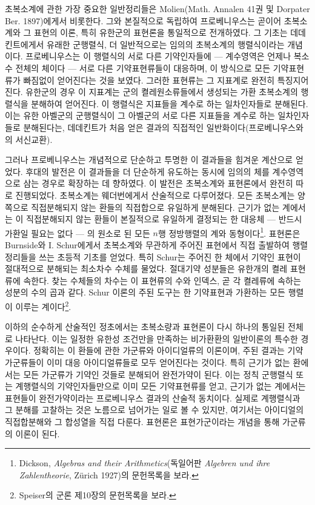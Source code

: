 초복소계에 관한 가장 중요한 일반정리들은 Molien(Math. Annalen 41권 및 Dorpater Ber. 1897)에게서 비롯한다. 그와 본질적으로 독립하여 프로베니우스는 곧이어 초복소계와 그 표현의 이론, 특히 유한군의 표현론을 통일적으로 전개하였다. 그 기초는 데데킨트에게서 유래한 군행렬식, 더 일반적으로는 임의의 초복소계의 행렬식이라는 개념이다. 프로베니우스는 이 행렬식의 서로 다른 기약인자들에 --- 계수영역은 언제나 복소수 전체의 체이다 --- 서로 다른 기약표현류들이 대응하며, 이 방식으로 모든 기약표현류가 빠짐없이 얻어진다는 것을 보였다. 그러한 표현류는 그 \glqq{}지표계\grqq{}로 완전히 특징지어진다. 유한군의 경우 이 지표계는 군의 켤레원소류들에서 생성되는 가환 초복소계의 행렬식을 분해하여 얻어진다. 이 행렬식은 지표들을 계수로 하는 일차인자들로 분해된다. 이는 유한 아벨군의 군행렬식이 그 아벨군의 서로 다른 지표들을 계수로 하는 일차인자들로 분해된다는, 데데킨트가 처음 얻은 결과의 직접적인 일반화이다(프로베니우스와의 서신교환).

그러나 프로베니우스는 개념적으로 단순하고 투명한 이 결과들을 힘겨운 계산으로 얻었다. 후대의 발전은 이 결과들을 더 단순하게 유도하는 동시에 임의의 체를 계수영역으로 삼는 경우로 확장하는 데 향하였다. 이 발전은 초복소계와 표현론에서 완전히 따로 진행되었다. 초복소계는 웨더번에게서 산술적으로 다루어졌다. 모든 초복소계는 양쪽으로 직접분해되지 않는 환들의 직접합으로 유일하게 분해된다. 근기가 없는 계에서는 이 직접분해되지 않는 환들이 본질적으로 유일하게 결정되는 한 대응체 --- 반드시 가환일 필요는 없다 --- 의 원소로 된 모든 \(n\)행 정방행렬의 계와 동형이다\footnote{Dickson, \emph{Algebras and their Arithmetics}(독일어판 \emph{Algebren und ihre Zahlentheorie}, Zürich 1927)의 문헌목록을 보라.}. 표현론은 Burnside와 I. Schur에게서 초복소계와 무관하게 주어진 표현에서 직접 출발하여 행렬정리들을 쓰는 초등적 기초를 얻었다. 특히 Schur는 주어진 한 체에서 기약인 표현이 절대적으로 분해되는 최소차수 수체를 물었다. 절대기약 성분들은 유한개의 켤레 표현류에 속한다. 찾는 수체들의 차수는 이 표현류의 수와 인덱스, 곧 각 켤레류에 속하는 성분의 수의 곱과 같다. Schur 이론의 주된 도구는 한 기약표현과 가환하는 모든 행렬이 이루는 계이다\footnote{Speiser의 군론 제10장의 문헌목록을 보라.}.

이하의 순수하게 산술적인 정초에서는 초복소량과 표현론이 다시 하나의 통일된 전체로 나타난다. 이는 일정한 유한성 조건만을 만족하는 비가환환의 일반이론의 특수한 경우이다. 정확히는 이 환들에 관한 가군류와 아이디얼류의 이론이며, 주된 결과는 기약 가군류들이 이미 대응 아이디얼류들로 모두 얻어진다는 것이다. 특히 근기가 없는 환에서는 모든 가군류가 기약인 것들로 분해되어 완전가약이 된다. 이는 정칙 군행렬식 또는 계행렬식의 기약인자들만으로 이미 모든 기약표현류를 얻고, 근기가 없는 계에서는 표현들이 완전가약이라는 프로베니우스 결과의 산술적 동치이다. 실제로 계행렬식과 그 분해를 고찰하는 것은 노름으로 넘어가는 일로 볼 수 있지만, 여기서는 아이디얼의 직접합분해와 그 합성열을 직접 다룬다. 표현론은 표현가군이라는 개념을 통해 가군류의 이론이 된다.

